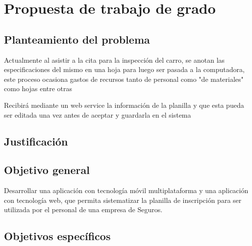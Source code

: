 \chapter{Propuesta de trabajo de grado}

\section{Planteamiento del problema}
\setlength{\parskip}{5mm}

Actualmente al asistir a la cita para la inspección del carro, se anotan las especificaciones del mismo en una hoja para luego ser pasada a la computadora, este proceso ocasiona gastos de recursos tanto de personal como "de materiales" como hojas entre otras  

Recibirá mediante un web service la información de la planilla y que esta pueda ser editada una vez antes de aceptar y guardarla en el sistema
\setlength{\parskip}{0mm}


\section{Justificación}



\section{Objetivo general}

Desarrollar una aplicación con tecnología móvil multiplataforma y una aplicación con tecnología web, que permita sistematizar la planilla de inscripción para ser utilizada por el personal de una empresa de Seguros. 

\section{Objetivos específicos}

